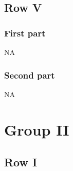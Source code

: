 \documentclass[9pt]{article}
\numberwithin{equation}{section}
\begin{document}
\subsection{Row V}
\subsubsection*{First part}
\textsc{NA}
\subsubsection*{Second part}
\textsc{NA}
\section{Group II}
\subsection{Row I}
\end{document}
